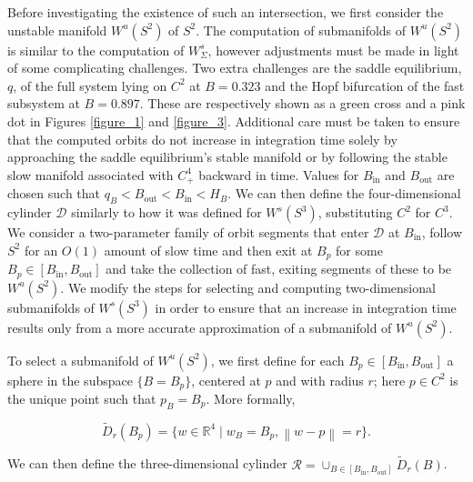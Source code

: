 \documentclass{ws-ijbc}
\begin{document}
Before investigating the existence of such an intersection, we first consider the unstable manifold $W^{u}(S^2)$ of $S^2$.  The computation of submanifolds of $W^{u}(S^2)$ is similar to the computation of $W^{s}_\Sigma$, however adjustments must be made in light of some complicating challenges.  Two extra challenges are the saddle equilibrium, $q$, of the full system lying on $C^2$ at $B = 0.323$ and the Hopf bifurcation of the fast subsystem at $B = 0.897$.  These are respectively shown as a green cross and a pink dot in Figures \ref{figure_1} and \ref{figure_3}.  Additional care must be taken to ensure that the computed orbits do not increase in integration time solely by approaching the saddle equilibrium's stable manifold or by following the stable slow manifold associated with $C^4_+$ backward in time.  Values for $B_{\mathrm{in}}$ and $B_{\mathrm{out}}$ are chosen such that $q_B < B_{\mathrm{out}} < B_{\mathrm{in}}< H_B$.  We can then define the four-dimensional cylinder $\mathscr{D}$ similarly to how it was defined for $W^s(S^3)$, substituting $C^2$ for $C^3$.  We consider a two-parameter family of orbit segments that enter $\mathscr{D}$ at $B_{\mathrm{in}}$, follow $S^2$ for an $O(1)$ amount of slow time and then exit at $B_p$ for some $B_p \in [B_{\mathrm{in}}, B_{\mathrm{out}}]$ and take the collection of fast, exiting segments of these to be $W^u(S^2)$.  We modify the steps for selecting and computing two-dimensional submanifolds of $W^s(S^3)$ in order to ensure that an increase in integration time results only from a more accurate approximation of a submanifold of $W^u(S^2)$.

To select a submanifold of $W^u(S^2)$, we first define for each $B_p \in [B_{\mathrm{in}}, B_{\mathrm{out}}]$ a sphere in the subspace $\{B=B_p\}$, centered at $p$ and with radius $r$; here $p \in C^2$ is the unique point such that $p_B = B_p$.  More formally,

\begin{equation*}
\widetilde{D}_r(B_p)=\{w \in \mathbb{R}^4 \;|\; w_B = B_p, \left\lVert w-p \right\lVert  = r\}.
\end{equation*}

\noindent
We can then define the three-dimensional cylinder $\mathscr{R} = \cup_{B \in [B_{\mathrm{in}}, B_{\mathrm{out}}]}\widetilde{D}_r(B)$.  
\end{document}
